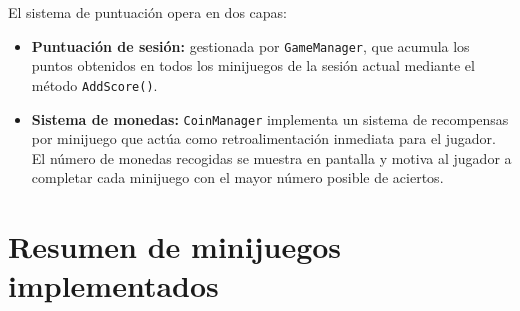 \documentclass[12pt, a4paper]{report}
\begin{document}
El sistema de puntuación opera en dos capas:

\begin{itemize}
  \item \textbf{Puntuación de sesión:} gestionada por \texttt{GameManager},
    que acumula los puntos obtenidos en todos los minijuegos de la sesión
    actual mediante el método \texttt{AddScore()}.
  \item \textbf{Sistema de monedas:} \texttt{CoinManager} implementa un
    sistema de recompensas por minijuego que actúa como retroalimentación
    inmediata para el jugador. El número de monedas recogidas se muestra
    en pantalla y motiva al jugador a completar cada minijuego con el
    mayor número posible de aciertos.
\end{itemize}

\section{Resumen de minijuegos implementados}
\end{document}
